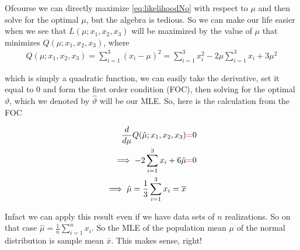 \documentclass[ 11pt,%
				a4paper,%
				twoside,%
				headinclude,%
				footinclude = true,%
				cleardoublepage = empty,%
				reqno]{scrbook}
\begin{document}
\begin{example}
Ofcourse we can directly maximize \cref{eq:likelihoodNo} with respect to $\mu$ and then solve for the optimal $\mu$, but the algebra is tedious. So we can make our life easier when we see that  $L(\mu; x_1, x_2, x_3) $ will be maximized by the value of $\mu$ that minimizes $Q(\mu; x_1, x_2, x_3)$, where 
\begin{align*}
 Q(\mu; x_1, x_2, x_3)=\sum_{i=1}^{3}\left(x_{i}-\mu\right)^{2}=\sum_{i=1}^{3} x_{i}^{2}-2 \mu \sum_{i=1}^{3} x_{i}+3 \mu^{2}
\end{align*}

which is simply a quadratic function, we can easily take the derivative, set it equal to $0$ and form the first order condition (FOC), then solving for the optimal $\vartheta$, which we denoted by $\hat{\vartheta}$ will be our MLE. So, here is the calculation from the FOC


\begin{align*}
\frac{d}{d \mu}  Q(\hat{\mu}; x_1, x_2, x_3)  &{\color{red}\stackrel{}{=}} 0 \\
\implies -2 \sum_{i=1}^{3} x_{i} + 6 \hat{\mu}&{\color{red}\stackrel{}{=}} 0\\
\implies \hat{\mu} = \frac{1}{3}\sum_{i=1}^{3} x_{i} = \overline{x}
\end{align*}



Infact we can apply this result even if we have data sets of $n$ realizations. So on that case $\hat{\mu} = \frac{1}{n}\sum_{i = 1}^{n} x_i$. So the MLE of the population mean $\mu$ of the normal distribution is sample mean $\bar{x}$. This makes sense, right!



\end{example}






\end{document}
